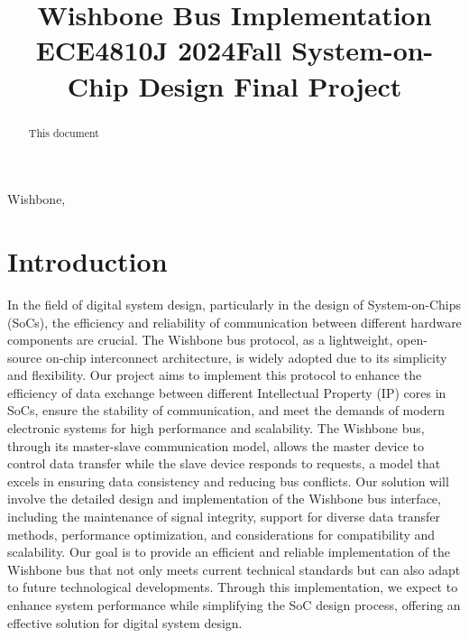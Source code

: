 \documentclass[conference]{IEEEtran}
\begin{document}
\title{Wishbone Bus Implementation\\
{\footnotesize \textsuperscript{}ECE4810J 2024Fall System-on-Chip Design Final Project}
}

\author{
\and
{}
\and
{}

}

\maketitle

\begin{abstract}
This document 
\end{abstract}

\begin{IEEEkeywords}
Wishbone, 
\end{IEEEkeywords}

\section{Introduction}
In the field of digital system design, particularly in the design of System-on-Chips (SoCs), the efficiency and reliability of communication between different hardware components are crucial. The Wishbone bus protocol, as a lightweight, open-source on-chip interconnect architecture, is widely adopted due to its simplicity and flexibility. Our project aims to implement this protocol to enhance the efficiency of data exchange between different Intellectual Property (IP) cores in SoCs, ensure the stability of communication, and meet the demands of modern electronic systems for high performance and scalability. The Wishbone bus, through its master-slave communication model, allows the master device to control data transfer while the slave device responds to requests, a model that excels in ensuring data consistency and reducing bus conflicts. Our solution will involve the detailed design and implementation of the Wishbone bus interface, including the maintenance of signal integrity, support for diverse data transfer methods, performance optimization, and considerations for compatibility and scalability. Our goal is to provide an efficient and reliable implementation of the Wishbone bus that not only meets current technical standards but can also adapt to future technological developments. Through this implementation, we expect to enhance system performance while simplifying the SoC design process, offering an effective solution for digital system design.\cite{Sharma_2012}
\end{document}
